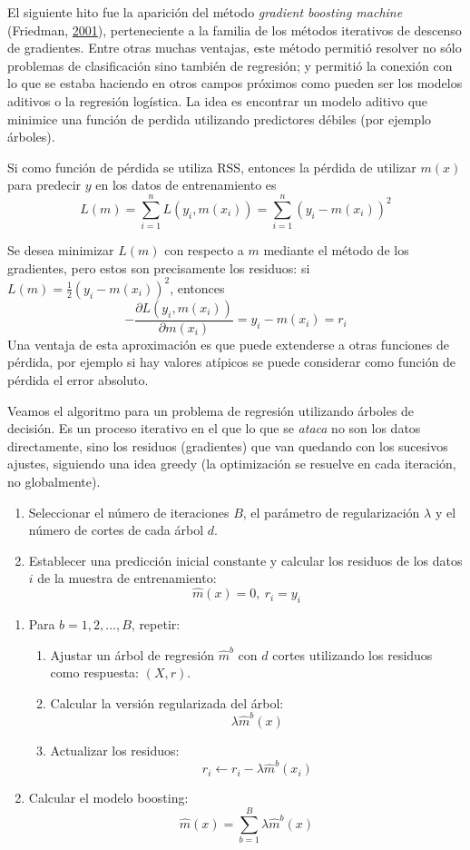 \documentclass[
  spanish,
]{book}
\theoremstyle{break}
\theoremstyle{definition}
\theoremstyle{definition}
\theoremstyle{definition}
\theoremstyle{remark}
\begin{document}
El siguiente hito fue la aparición del método \emph{gradient boosting machine} (Friedman, \protect\hyperlink{ref-friedman2001greedy}{2001}), perteneciente a la familia de los métodos iterativos de descenso de gradientes.
Entre otras muchas ventajas, este método permitió resolver no sólo problemas de clasificación sino también de regresión; y permitió la conexión con lo que se estaba haciendo en otros campos próximos como pueden ser los modelos aditivos o la regresión logística.
La idea es encontrar un modelo aditivo que minimice una función de perdida utilizando predictores débiles (por ejemplo árboles).

Si como función de pérdida se utiliza RSS, entonces la pérdida de utilizar \(m(x)\) para predecir \(y\) en los datos de entrenamiento es \[L(m) = \sum_{i=1}^n L(y_i, m(x_i)) = \sum_{i=1}^n (y_i - m(x_i))^2\]

Se desea minimizar \(L(m)\) con respecto a \(m\) mediante el método de los gradientes, pero estos son precisamente los residuos: si \(L(m)= \frac{1}{2} (y_i - m(x_i))^2\), entonces
\[- \frac{\partial L(y_i, m(x_i))} {\partial m(x_i)} = y_i - m(x_i) = r_i\]
Una ventaja de esta aproximación es que puede extenderse a otras funciones de pérdida, por ejemplo si hay valores atípicos se puede considerar como función de pérdida el error absoluto.

Veamos el algoritmo para un problema de regresión utilizando árboles de decisión. Es un proceso iterativo en el que lo que se \emph{ataca} no son los datos directamente, sino los residuos (gradientes) que van quedando con los sucesivos ajustes, siguiendo una idea greedy (la optimización se resuelve en cada iteración, no globalmente).

\begin{enumerate}
\def\labelenumi{\arabic{enumi}.}
\item
  Seleccionar el número de iteraciones \(B\), el parámetro de regularización \(\lambda\) y el número de cortes de cada árbol \(d\).
\item
  Establecer una predicción inicial constante y calcular los residuos de los datos \(i\) de la muestra de entrenamiento: \[\hat m (x) = 0, \ r_i = y_i\]
\end{enumerate}

\begin{enumerate}
\def\labelenumi{\arabic{enumi}.}
\item
  Para \(b = 1, 2,\ldots, B\), repetir:

  \begin{enumerate}
  \def\labelenumii{\alph{enumii}.}
  \item
    Ajustar un árbol de regresión \(\hat m^b\) con \(d\) cortes utilizando los residuos como respuesta: \((X, r)\).
  \item
    Calcular la versión regularizada del árbol:
    \[\lambda \hat m^b (x)\]
  \item
    Actualizar los residuos:
    \[r_i \leftarrow r_i - \lambda \hat m^b (x_i)\]
  \end{enumerate}
\item
  Calcular el modelo boosting:
  \[\hat m (x) = \sum_{b=1}^{B} \lambda \hat m^b (x)\]
\end{enumerate}
\end{document}
